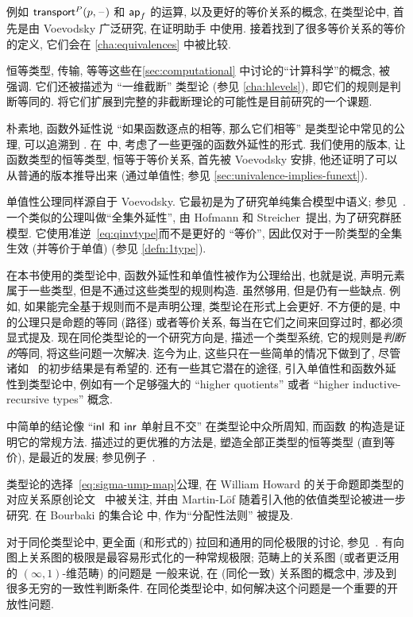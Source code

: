 %
例如 $\mathsf{transport}^{P}(p,\mathord{\hspace{1pt}\text{--}\hspace{1pt}})$ 和 $\mathsf{ap}_{f}$ 的运算, 以及更好的等价关系的概念, 在类型论中, 首先是由 Voevodsky 广泛研究, 在证明助手 \Coq 中使用.
接着找到了很多等价关系的等价的定义, 它们会在 \cref{cha:equivalences} 中被比较.

恒等类型, 传输, 等等这些在\cref{sec:computational} 中讨论的``计算科学''的概念, 被~\cite{lh:canonicity} 强调.
它们还被描述为 ``一维截断'' 类型论 (参见 \cref{cha:hlevels}), 即它们的规则是判断等同的.
将它们扩展到完整的非截断理论的可能性是目前研究的一个课题.

%
朴素地, 函数外延性说 ``如果函数逐点的相等, 那么它们相等'' 是类型论中常见的公理, 可以追溯到 \cite{PM2}.
在~\cite{garner:depprod}中, 考虑了一些更强的函数外延性的形式.
我们使用的版本, 让函数类型的恒等类型, 恒等于等价关系, 首先被 Voevodsky 安排, 他还证明了可以从普通的版本推导出来 (通过单值性; 参见 \cref{sec:univalence-implies-funext}).

%
单值性公理同样源自于 Voevodsky.
它最初是为了研究单纯集合模型中语义; 参见~\cite{klv:ssetmodel}.
一个类似的公理叫做``全集外延性'', 由 Hofmann 和 Streicher~\cite{hs:gpd-typethy}提出, 为了研究群胚模型.
它使用准逆~\eqref{eq:qinvtype}而不是更好的 ``等价'', 因此仅对于一阶类型的全集生效 (并等价于单值) (参见 \cref{defn:1type}).

在本书使用的类型论中, 函数外延性和单值性被作为公理给出, 也就是说, 声明元素属于一些类型, 但是不通过这些类型的规则构造.
虽然够用, 但是仍有一些缺点.
例如, 如果能完全基于规则而不是声明公理, 类型论在形式上会更好.
不方便的是,  中的公理只是命题的等同 (路径) 或者等价关系, 每当在它们之间来回穿过时, 都必须显式提及.
现在同伦类型论的一个研究方向是, 描述一个类型系统, 它的规则是\emph{判断的}等同, 将这些问题一次解决.
迄今为止, 这些只在一些简单的情况下做到了, 尽管诸如~\cite{lh:canonicity} 的初步结果是有希望的.
还有一些其它潜在的途径, 引入单值性和函数外延性到类型论中, 例如有一个足够强大的 ``higher quotients'' 或者 ``higher inductive-recursive types'' 概念.

 中简单的结论像 ``${\mathsf{inl}}$ 和 ${\mathsf{inr}}$ 单射且不交'' 在类型论中众所周知, 而函数 \encode 的构造是证明它的常规方法.
描述过的更优雅的方法是, 塑造全部正类型的恒等类型 (直到等价), 是最近的发展; 参见例子~\cite{ls:pi1s1}.

%
类型论的选择~\eqref{eq:sigma-ump-map}公理, 在 William Howard 的关于命题即类型的对应关系原创论文~\cite{howard:pat} 中被关注, 并由 Martin-L\"of 随着引入他的依值类型论被进一步研究.
在 Bourbaki 的集合论 \cite{Bourbaki} 中, 作为``分配性法则'' 被提及.%

对于同伦类型论中, 更全面 (和形式的) 拉回和通用的同伦极限的讨论, 参见~\cite{AKL13}.
有向图上关系图的极限是最容易形式化的一种常规极限; 范畴上的关系图 (或者更泛用的 $(\infty,1)$-维范畴) 的问题是
%
%
一般来说, 在 (同伦一致) 关系图的概念中, 涉及到很多无穷的一致性判断条件.
在同伦类型论中, 如何解决这个问题是一个重要的开放性问题.